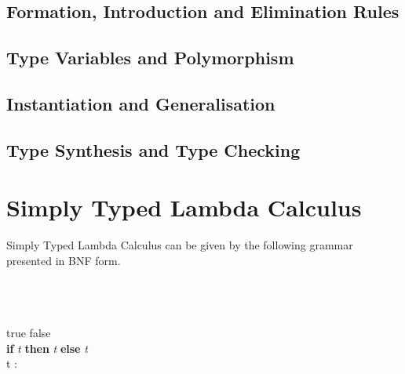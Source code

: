 \documentclass[a4paper,11pt]{article}
\begin{document}
\subsection{Formation, Introduction and Elimination Rules}

\subsection{Type Variables and Polymorphism}

\subsection{Instantiation and Generalisation}

\subsection{Type Synthesis and Type Checking}


\section{\bf{Simply Typed Lambda Calculus}}
Simply Typed Lambda Calculus can be given by the following grammar presented in BNF form. 
\begin{bnf*}
   \bnfsk {}  \\ 
  \bnfmore \bnfor {}  \\
  \bnfmore \bnfor {}  \\ 
  \bnfmore \bnfor true \bnfor false \\ 
  \bnfmore \bnfor \textbf{if} \textit{ t } \textbf{then} \textit{ t } \textbf{else} \textit{ t } \\ 
  \bnfmore \bnfor t : \tau \\ 
  \bnfprod{$\tau$} 
   \\ 
  \bnfmore \bnfor \bnfpn{$\tau \rightarrow \tau$} 
\end{bnf*}
\end{document}
